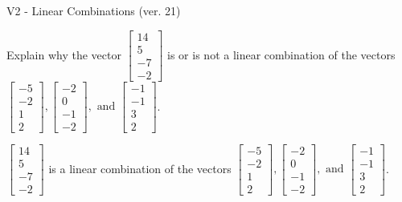 \begin{exercise}
  \begin{exerciseTitle}V2 - Linear Combinations (ver. 21)\end{exerciseTitle}
  \begin{exerciseStatement}
    Explain why the vector \(\left[\begin{array}{c}
14 \\
5 \\
-7 \\
-2
\end{array}\right]\)  is or is not a linear 
	combination of the vectors \(\left[\begin{array}{c}
-5 \\
-2 \\
1 \\
2
\end{array}\right] , \left[\begin{array}{c}
-2 \\
0 \\
-1 \\
-2
\end{array}\right] , \text{ and } \left[\begin{array}{c}
-1 \\
-1 \\
3 \\
2
\end{array}\right]\).
	


  \end{exerciseStatement}
  \begin{exerciseAnswer}
   \(\left[\begin{array}{c}
14 \\
5 \\
-7 \\
-2
\end{array}\right]\) 
  	 is  
	a linear combination of the vectors \(\left[\begin{array}{c}
-5 \\
-2 \\
1 \\
2
\end{array}\right] , \left[\begin{array}{c}
-2 \\
0 \\
-1 \\
-2
\end{array}\right] , \text{ and } \left[\begin{array}{c}
-1 \\
-1 \\
3 \\
2
\end{array}\right]\).

	
  


  \end{exerciseAnswer}
\end{exercise}